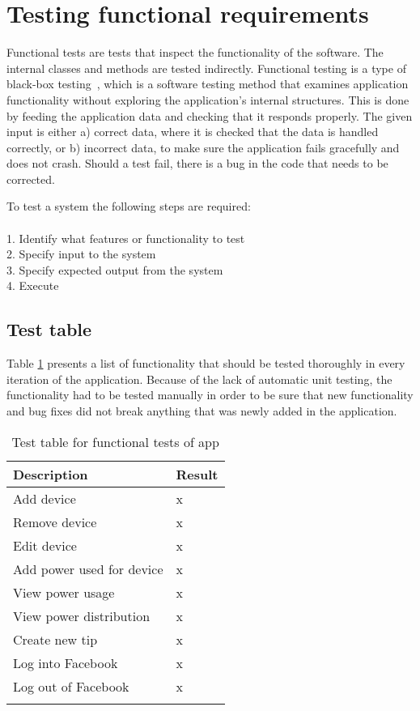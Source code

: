\newpage
\section{Testing functional requirements}
\label{sec:funcTest}
Functional tests are tests that inspect the functionality of the software. The internal classes and methods are tested indirectly. Functional testing is a type of black-box testing~\cite{blackbox}, which is a software testing method that examines application functionality without exploring the application's internal structures. This is done by feeding the application data and checking that it responds properly. The given input is either a) correct data, where it is checked that the data is handled correctly, or b) incorrect data, to make sure the application fails gracefully and does not crash. Should a test fail, there is a bug in the code that needs to be corrected.

To test a system the following steps are required:\\\\
1. Identify what features or functionality to test\\
2. Specify input to the system\\
3. Specify expected output from the system\\
4. Execute

\subsection{Test table}
Table \ref{tab:testTable} presents a list of functionality that should be tested thoroughly in every iteration of the application. Because of the lack of automatic unit testing, the functionality had to be tested manually in order to be sure that new functionality and bug fixes did not break anything that was newly added in the application.

\begin{table}[H]
\centering
{}
\begin{tabular}{|l|l|}
\textbf{Description} & \textbf{Result}\\\hline 
\arrayrulecolor{lightgray}
Add device&x\\ \cline{1-2}
Remove device&x\\ \cline{1-2}
Edit device&x\\ \cline{1-2}
Add power used for device&x\\ \cline{1-2}
View power usage&x\\ \cline{1-2}
View power distribution&x\\ \cline{1-2}
Create new tip&x\\ \cline{1-2}
Log into Facebook&x\\ \cline{1-2}
Log out of Facebook&x\\\arrayrulecolor{black}
\hline
\end{tabular}
\caption{Test table for functional tests of app}
\label{tab:testTable}
\end{table}

